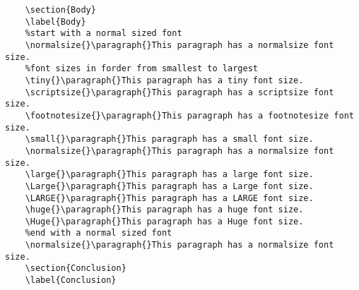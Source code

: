 \begin{lstlisting}
    \section{Body}
    \label{Body}
    %start with a normal sized font
    \normalsize{}\paragraph{}This paragraph has a normalsize font size.
    %font sizes in forder from smallest to largest
    \tiny{}\paragraph{}This paragraph has a tiny font size.
    \scriptsize{}\paragraph{}This paragraph has a scriptsize font size.
    \footnotesize{}\paragraph{}This paragraph has a footnotesize font size.
    \small{}\paragraph{}This paragraph has a small font size.
    \normalsize{}\paragraph{}This paragraph has a normalsize font size.
    \large{}\paragraph{}This paragraph has a large font size.
    \Large{}\paragraph{}This paragraph has a Large font size.
    \LARGE{}\paragraph{}This paragraph has a LARGE font size.
    \huge{}\paragraph{}This paragraph has a huge font size.
    \Huge{}\paragraph{}This paragraph has a Huge font size.
    %end with a normal sized font
    \normalsize{}\paragraph{}This paragraph has a normalsize font size.
    \section{Conclusion}
    \label{Conclusion}
    
\end{lstlisting}
